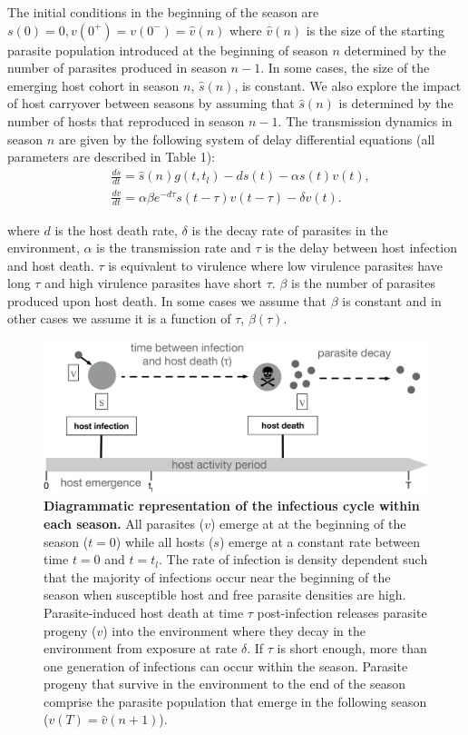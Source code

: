 \documentclass{article}
\begin{document}
The initial conditions in the beginning of the season are $s(0) = 0, v(0^+) = v(0^-) = \hat{v}(n)$ where $\hat{v}(n)$ is the size of the starting parasite population introduced at the beginning of season $n$ determined by the number of parasites produced in season $n-1$. In some cases, the size of the emerging host cohort in season $n$, $\hat{s}(n)$, is constant. We also explore the impact of host carryover between seasons by assuming that $\hat{s}(n)$ is determined by the number of hosts that reproduced in season $n-1$. The transmission dynamics in season $n$ are given by the following system of delay differential equations (all parameters are described in Table 1):
\begin{align*}
&\frac{ds}{dt} = \hat{s}(n)g(t,t_{l})-ds(t)- \alpha s(t)v(t),\tag{1a}\\
&\frac{dv}{dt} = \alpha \beta e^{-d\tau} s(t-\tau)v(t-\tau)-\delta v(t).\tag{1b}
\end{align*}

\noindent where $d$ is the host death rate, $\delta$ is the decay rate of parasites in the environment, $\alpha$ is the transmission rate and $\tau$ is the delay between host infection and host death. $\tau$ is equivalent to virulence where low virulence parasites have long $\tau$ and high virulence parasites have short $\tau$. $\beta$ is the number of parasites produced upon host death. In some cases we assume that $\beta$ is constant and in other cases we assume it is a function of $\tau$, $\beta(\tau)$.
\begin{figure}[hb!]
  \centering
      \centering
      \includegraphics[width=\textwidth]{infection diagram bistability.pdf}%
 \hspace{2cm}
    \caption{\textbf{Diagrammatic representation of the infectious cycle within each season. } All parasites ($v$) emerge at at the beginning of the season ($t=0$) while all hosts ($s$) emerge at a constant rate between time $t=0$ and $t=t_{l}$.  The rate of infection is density dependent such that the majority of infections occur near the beginning of the season when susceptible host and free parasite densities are high. Parasite-induced host death at time $\tau$ post-infection releases parasite progeny ($v$) into the environment where they decay in the environment from exposure at rate $\delta$. If $\tau$ is short enough, more than one generation of infections can occur within the season. Parasite progeny that survive in the environment to the end of the season comprise the parasite population that emerge in the following season ($v(T) = \hat{v}(n+1)$).
    }
\end{figure}
\end{document}
